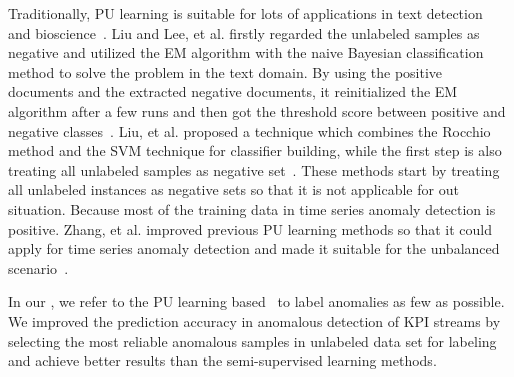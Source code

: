 Traditionally, PU learning is suitable for lots of applications in text detection~\cite{Li2014SpottingFR, Liu2002PartiallySC, putranditional2003, ren-etal-2014-positive} and bioscience~\cite{Mordelet_2011, Yang2014EnsemblePU}. Liu and Lee, et al. firstly regarded the unlabeled samples as negative and utilized the EM algorithm with the naive Bayesian classification method to solve the problem in the text domain. By using the positive documents and the extracted negative documents, it reinitialized the EM algorithm after a few runs and then got the threshold score between positive and negative classes~\cite{putranditional2003}.  Liu, et al. proposed a technique which combines the Rocchio method and the SVM technique for classifier building, while the first step is also treating all unlabeled samples as negative set~\cite{Liu2002PartiallySC}. These methods start by treating all unlabeled instances as negative sets so that it is not applicable for out situation. Because most of the training data in time series anomaly detection is positive. Zhang, et al. improved previous PU learning methods so that it could apply for time series anomaly detection and made it suitable for the unbalanced scenario~\cite{PUlearning2017}. 

In our \name{}, we refer to the PU learning based~\cite{PUlearning2017} to label anomalies as few as possible. We improved the prediction accuracy in anomalous detection of KPI streams by selecting the most reliable anomalous samples in unlabeled data set for labeling and achieve better results than the semi-supervised learning methods.


